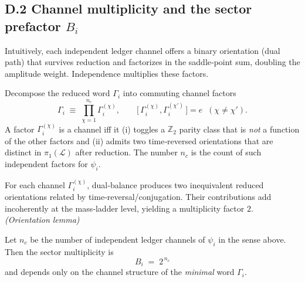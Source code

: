 \documentclass[11pt]{article}
\begin{document}
\begin{proposition}
\subsection*{D.2  Channel multiplicity and the sector prefactor \(B_i\)}
Intuitively, each independent ledger channel offers a binary orientation (dual path) that survives reduction and factorizes in the saddle‑point sum, doubling the amplitude weight. Independence multiplies these factors.

\begin{definition}
Decompose the reduced word \(\Gamma_i\) into commuting channel factors
\[
\Gamma_i \;\equiv\; \prod_{\chi=1}^{n_c} \Gamma_i^{(\chi)},
\qquad
\bigl[\,\Gamma_i^{(\chi)},\Gamma_i^{(\chi')}\,\bigr]=e
\;\;(\chi\neq\chi').
\]
A factor \(\Gamma_i^{(\chi)}\) is a channel iff it (i) toggles a \(\mathbb Z_2\) parity class that is \emph{not} a function of the other factors and (ii) admits two time‑reversed orientations that are distinct in \(\pi_1(\mathscr L)\) after reduction. The number \(n_c\) is the count of such independent factors for \(\psi_i\).%
\end{definition}

\begin{lemma}
For each channel \(\Gamma_i^{(\chi)}\), dual‑balance produces two inequivalent reduced orientations related by time‑reversal/conjugation. Their contributions add incoherently at the mass‑ladder level, yielding a multiplicity factor \(2\). \hfill\emph{(Orientation lemma)}
\end{lemma}

\begin{theorem}
Let \(n_c\) be the number of independent ledger channels of \(\psi_i\) in the sense above. Then the sector multiplicity is
\[
\boxed{\;B_i \;=\; 2^{\,n_c}\;}
\]
and depends only on the channel structure of the \emph{minimal} word \(\Gamma_i\).
\end{theorem}


\end{proposition}
\end{document}
